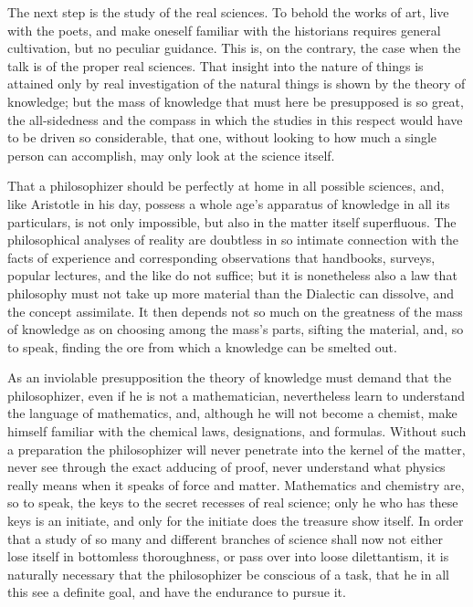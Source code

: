 \documentclass[12pt]{book}
\begin{document}
The next step is the study of the real sciences. To behold the works of art, live with the
poets, and make oneself
familiar with the historians requires general cultivation, but no peculiar guidance. This is,
on the contrary, the case when the talk is of the proper real sciences. That insight into the
nature of things is attained only by real investigation of the natural things is shown by the
theory of knowledge; but the mass of knowledge that must here be presupposed is so great, the
all-sidedness and the compass in which the studies in this respect would have to be driven so
considerable, that one, without looking to how much a single person can accomplish, may only
look at the science itself.

That a philosophizer should be perfectly at home in all possible sciences, and, like Aristotle
in his day, possess a whole age's apparatus of knowledge in all its particulars, is not only
impossible, but also in the matter itself superfluous. The philosophical analyses of reality
are doubtless in so intimate connection with the facts of experience and corresponding
observations that handbooks, surveys, popular lectures, and the like do not suffice; but it is
nonetheless also a law that philosophy must not take up more material than the Dialectic can
dissolve, and the concept assimilate. It then depends not so much on the greatness of the mass
of knowledge as on choosing among the mass's parts, sifting the material, and, so to speak,
finding the ore from which a knowledge can be smelted out.

As an inviolable presupposition the theory of knowledge must demand that the philosophizer,
even if he is not a mathematician, nevertheless learn to understand the language of mathematics,
and, although he will not become a chemist, make himself familiar with the chemical laws,
designations, and formulas. Without such a preparation the philosophizer will never penetrate
into the kernel of the matter, never see through the exact adducing of proof, never understand
what physics really means when it speaks of force and matter. Mathematics and chemistry are, so
to speak, the keys to the secret recesses of real science; only he who has these keys is an
initiate, and only for the initiate does the treasure show itself.
In order that a study of so many and different branches of science shall now not either lose
itself in bottomless thoroughness, or pass over into loose dilettantism, it is naturally
necessary that the philosophizer be conscious of a task, that he in all this see a definite
goal, and have the endurance to pursue it.
\end{document}
